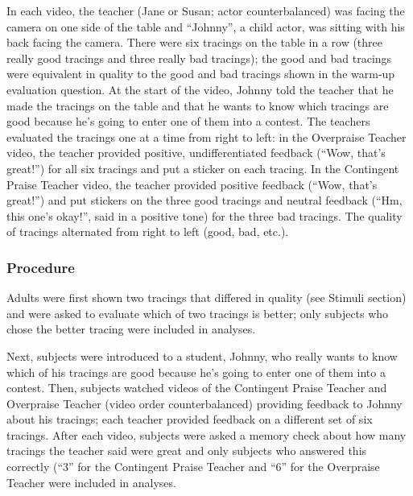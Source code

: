 \documentclass[10pt, letterpaper]{article}
\begin{document}
In each video, the teacher (Jane or Susan; actor counterbalanced) was
facing the camera on one side of the table and ``Johnny'', a child
actor, was sitting with his back facing the camera. There were six
tracings on the table in a row (three really good tracings and three
really bad tracings); the good and bad tracings were equivalent in
quality to the good and bad tracings shown in the warm-up evaluation
question. At the start of the video, Johnny told the teacher that he
made the tracings on the table and that he wants to know which tracings
are good because he's going to enter one of them into a contest. The
teachers evaluated the tracings one at a time from right to left: in the
Overpraise Teacher video, the teacher provided positive,
undifferentiated feedback (``Wow, that's great!'') for all six tracings
and put a sticker on each tracing. In the Contingent Praise Teacher
video, the teacher provided positive feedback (``Wow, that's great!'')
and put stickers on the three good tracings and neutral feedback (``Hm,
this one's okay!'', said in a positive tone) for the three bad tracings.
The quality of tracings alternated from right to left (good, bad, etc.).

\subsubsection{Procedure}\label{procedure}

Adults were first shown two tracings that differed in quality (see
Stimuli section) and were asked to evaluate which of two tracings is
better; only subjects who chose the better tracing were included in
analyses.

Next, subjects were introduced to a student, Johnny, who really wants to
know which of his tracings are good because he's going to enter one of
them into a contest. Then, subjects watched videos of the Contingent
Praise Teacher and Overpraise Teacher (video order counterbalanced)
providing feedback to Johnny about his tracings; each teacher provided
feedback on a different set of six tracings. After each video, subjects
were asked a memory check about how many tracings the teacher said were
great and only subjects who answered this correctly (``3'' for the
Contingent Praise Teacher and ``6'' for the Overpraise Teacher were
included in analyses.
\end{document}
